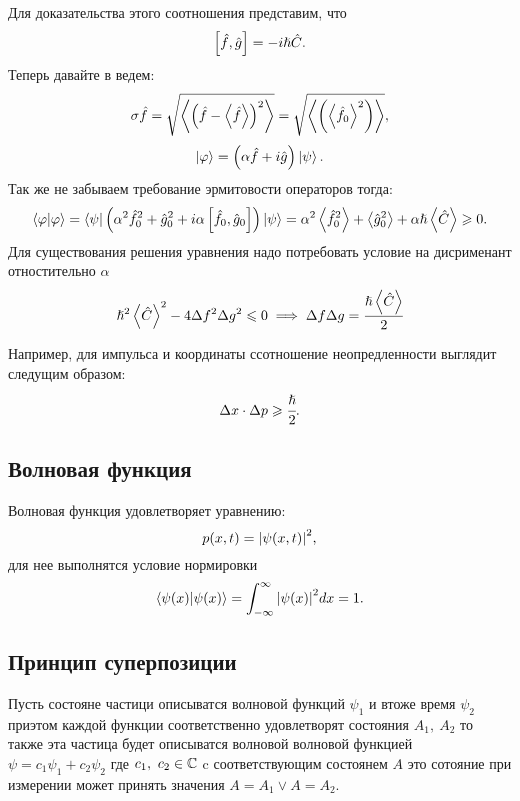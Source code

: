 \stp Для доказательства этого соотношения представим, что
\begin{equation*} 
 \insqr{\hat f, \hat g} = - i \hslash \hat C.
\end{equation*}  
Теперь давайте в ведем:
\begin{equation*} 
  \sigma \hat f = \sqrt{\ave{\inner{\hat f - \ave{\hat f}}^2 }} 
  = \sqrt{\ave{\inner{ \ave{\hat f_0}^2 }}},
\end{equation*} 
\begin{equation*} 
 \ket{\phi } = \inner{\alpha \hat f + i \hat g }\ket{\psi}.
\end{equation*} 
Так же не забываем требование эрмитовости операторов тогда:
\begin{equation*} 
 \braket{\phi}{\phi} = \bra{\psi} \inner{\alpha^2 \hat f_0^2 + 
 \hat g_0^2 + i\alpha \insqr{\hat f_0, \hat g_0}} \ket{\psi} = 
 \alpha^2 \ave{\hat f_0^2} +  \ave{ \hat g_0^2} + \alpha \hslash 
 \ave{\hat C} \geq 0.
\end{equation*} 
Для существования решения уравнения надо потребовать условие на 
дисрименант отностительно $ \alpha $
\begin{equation*} 
 \hslash^2 \ave{\hat C}^2 - 4 \Delta f^2 \Delta g^2 \leq 0 \implies  \Delta f \Delta g =  \cfrac{\hslash\ave{\hat C}}{2} 
\end{equation*} 
\enp

Например, для импульса и координаты ссотношение неопредленности 
выглядит следущим образом:
\begin{equation} 
 \Delta x \cdot \Delta p \geq \cfrac{\hslash}{2}.
\end{equation} 

\subsection{Волновая функция}
\tab Волновая функция удовлетворяет уравнению:
\begin{equation} 
 p (x, t) = \abs{\psi (x, t)}^2,
\end{equation} 
для нее выполнятся условие нормировки 
\begin{equation} 
 \braket{\psi (x)}{\psi (x)} = \int_{-\infty}^{\infty} 
  \abs{\psi (x)}^2 dx = 1.
\end{equation} 
   
\subsection{Принцип суперпозиции}
Пусть состояне частици описыватся волновой функций $\psi_1$
 и втоже время $\psi_2$ приэтом каждой функции соответственно удовлетворят
 состояния $A_1, \ A_2$ то также эта частица будет описыватся волновой 
 волновой функцией $\psi = c_1 \psi_1 + c_2 \psi_2$ где $c_1, \ c_2 \in 
 \com$ c соответствующим состоянем $A$ это сотояние при 
 измерении может принять значения $A = A_1 \lor A = A_2$.

